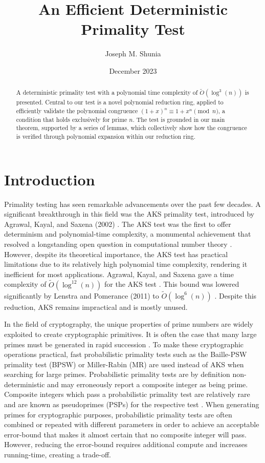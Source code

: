 \documentclass{article}
\title{An Efficient Deterministic Primality Test}
\author{Joseph M. Shunia}
\date{December 2023}
\theoremstyle{plain}
\theoremstyle{definition}
\begin{document}
\maketitle

\begin{abstract}
A deterministic primality test with a polynomial time complexity of $\tilde{O}(\log^3(n))$ is presented. Central to our test is a novel polynomial reduction ring, applied to efficiently validate the polynomial congruence $(1 + x)^n \equiv 1 + x^n \pmod{n}$, a condition that holds exclusively for prime $n$. The test is grounded in our main theorem, supported by a series of lemmas, which collectively show how the congruence is verified through polynomial expansion within our reduction ring.
\end{abstract}

\section{Introduction}

Primality testing has seen remarkable advancements over the past few decades. A significant breakthrough in this field was the AKS primality test, introduced by Agrawal, Kayal, and Saxena (2002) \cite{aks2002}. The AKS test was the first to offer determinism and polynomial-time complexity, a monumental achievement that resolved a longstanding open question in computational number theory \cite{goldreich2008}. However, despite its theoretical importance, the AKS test has practical limitations due to its relatively high polynomial time complexity, rendering it inefficient for most applications. Agrawal, Kayal, and Saxena gave a time complexity of $\tilde{O}(\log^{12}(n))$ for the AKS test \cite{aks2002}. This bound was lowered significantly by Lenstra and Pomerance (2011) to $\tilde{O}(\log^6(n))$ \cite{lenstra2011}. Despite this reduction, AKS remains impractical and is mostly unused.

In the field of cryptography, the unique properties of prime numbers are widely exploited to create cryptographic primitives. It is often the case that many large primes must be generated in rapid succession \cite{lenstra1987}. To make these cryptographic operations practical, fast probabilistic primality tests such as the Baille-PSW primality test (BPSW) \cite{baillie1980} or Miller-Rabin (MR) \cite{rabin1980} \cite{miller1976} are used instead of AKS when searching for large primes. Probabilistic primality tests are by definition non-deterministic and may erroneously report a composite integer as being prime. Composite integers which pass a probabilistic primality test are relatively rare and are known as pseudoprimes (PSPs) for the respective test \cite{wagstaff1983}. When generating primes for cryptographic purposes, probabilistic primality tests are often combined or repeated with different parameters in order to achieve an acceptable error-bound that makes it almost certain that no composite integer will pass. However, reducing the error-bound requires additional compute and increases running-time, creating a trade-off.
\end{document}
